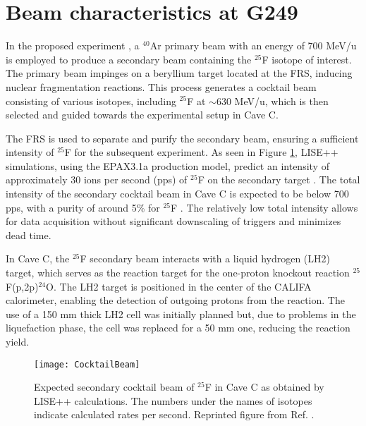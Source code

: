\section{Beam characteristics at G249}

In the proposed experiment \cite{panin2024neutron}, a $^{40}$Ar primary beam with an energy of 700 MeV/u is employed to produce a secondary beam containing the $^{25}$F isotope of interest. The primary beam impinges on a beryllium target located at the \gls{FRS}, inducing nuclear fragmentation reactions. This process generates a cocktail beam consisting of various isotopes, including $^{25}$F at $\sim$630 MeV/u, which is then selected and guided towards the experimental setup in Cave C.

The \gls{FRS} is used to separate and purify the secondary beam, ensuring a sufficient intensity of $^{25}$F for the subsequent experiment. As seen in Figure \ref{fig:CocktailBeam}, LISE++ simulations, using the EPAX3.1a production model, predict an intensity of approximately 30 ions per second (pps) of $^{25}$F on the secondary target \cite{panin2024neutron}. The total intensity of the secondary cocktail beam in Cave C is expected to be below 700 pps, with a purity of around 5\% for $^{25}$F \cite{panin2024neutron}. The relatively low total intensity allows for data acquisition without significant downscaling of triggers and minimizes dead time.

In Cave C, the $^{25}$F secondary beam interacts with a liquid hydrogen (LH2) target, which serves as the reaction target for the one-proton knockout reaction $^{25}$F(p,2p)$^{24}$O. The LH2 target is positioned in the center of the CALIFA calorimeter, enabling the detection of outgoing protons from the reaction. The use of a 150 mm thick LH2 cell was initially planned but, due to problems in the liquefaction phase, the cell was replaced for a 50 mm one, reducing the reaction yield. 


\begin{figure}
	\centering
	\texttt{[image: CocktailBeam]}
	\caption[Expected secondary cocktail beam of $^{25}$F in Cave C]{Expected secondary cocktail beam of $^{25}$F in Cave C as obtained by LISE++ calculations. The numbers under the names of isotopes indicate calculated rates per second. Reprinted figure from Ref. \cite{panin2024neutron}.}
	\label{fig:CocktailBeam}
\end{figure}


